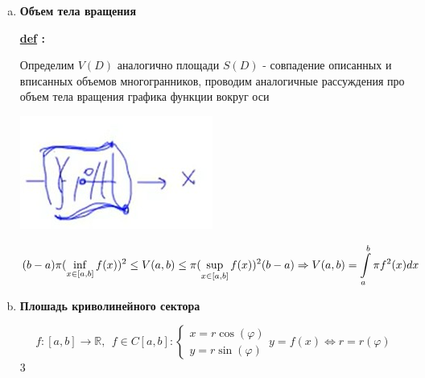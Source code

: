 \documentclass[a4paper,11pt]{article}
\renewcommand{\phi}{\ensuremath{\varphi}}
\newcommand{\Def}[1]{ 
\noindent\makebox[\linewidth]{\rule{\textwidth}{1pt}} 

 \noindent \textbf{\underline{def} :}
#1 

\noindent\makebox[\linewidth]{\rule{\textwidth}{1pt}} }
\newcommand{\R}{\mathbb{R}}
\newcommand{\formula}[1]{
\begin{myquote} 
	\centering
	\begin{equation}
	{#1}
	\end{equation}
\end{myquote}
 }
\begin{document}
\begin{enumerate}[a)]
\Def
{ \[
	\begin{cases}
		\int\limits_a^b f(x)dx - \text{Алгебраическая площадь} \\
		\int\limits_a^b |f(x)|dx - \text{Собственная площадь}
	\end{cases}
	\]
}
\item \textbf{Объем тела вращения} 

\Def
{
Определим $V(D)$ аналогично площади $S(D)$ - совпадение описанных и вписанных объемов многогранников, проводим аналогичные рассуждения про объем тела вращения графика функции вокруг оси
}

\includegraphics{сurveV.jpg}

\formula{\label{eq:funcV}
 (b-a) \pi (\inf\limits_{x\in[a, b]} f(x))^2\leq V(a ,b) \leq \pi (\sup\limits_{x\in[a, b]} f(x))^2(b-a) \Rightarrow V(a, b) = \int\limits_a^b \pi f^2(x)dx
}

\item \textbf{ Плошадь криволинейного сектора}

\[
f: [a, b] \to \R,  \ \ f\in C[a ,b] :
\begin{cases}
	x = r\cos(\phi) \\
	y = r\sin(\phi)
\end{cases}
 y = f(x) \Leftrightarrow r = r(\phi)
\]3


\end{enumerate}
\end{document}
